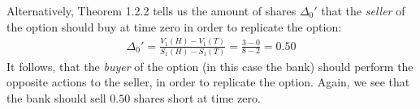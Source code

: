 \documentclass[12pt, letterpaper]{article}
\begin{document}
\vspace{5mm}
Alternatively, Theorem 1.2.2 tells us the amount of shares $\Delta_0'$ that the \textit{seller} of the option should buy at time zero in order to replicate the option:
\begin{gather*}
    \Delta_0 ' = \frac{V_1(H)-V_1(T)}{S_1(H)- S_1(T)} = \frac{3-0}{8-2} = 0.50
\end{gather*}
It follows, that the \textit{buyer} of the option (in this case the bank) should perform the opposite actions to the seller, in order to replicate the option.
Again, we see that the bank should sell $0.50$ shares short at time zero.


\rightline{$\square$}
\end{document}
